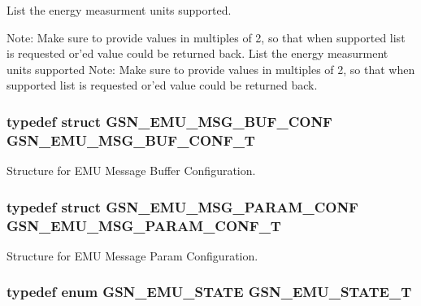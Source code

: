 List the energy measurment units supported. 

Note: Make sure to provide values in multiples of 2, so that when supported list is requested or'ed value could be returned back. List the energy measurment units supported Note: Make sure to provide values in multiples of 2, so that when supported list is requested or'ed value could be returned back. \hypertarget{a00663_gacf296ce2d4fd56e05d1ddfc4e41e07ce}{
\subsubsection[{GSN\_\-EMU\_\-MSG\_\-BUF\_\-CONF\_\-T}]{\setlength{\rightskip}{0pt plus 5cm}typedef struct {\bf GSN\_\-EMU\_\-MSG\_\-BUF\_\-CONF} {\bf GSN\_\-EMU\_\-MSG\_\-BUF\_\-CONF\_\-T}}}
\label{a00663_gacf296ce2d4fd56e05d1ddfc4e41e07ce}


Structure for EMU Message Buffer Configuration. 

\hypertarget{a00663_gae3dd9cf1f519ba6879f6f928ac33c1c4}{
\subsubsection[{GSN\_\-EMU\_\-MSG\_\-PARAM\_\-CONF\_\-T}]{\setlength{\rightskip}{0pt plus 5cm}typedef struct {\bf GSN\_\-EMU\_\-MSG\_\-PARAM\_\-CONF} {\bf GSN\_\-EMU\_\-MSG\_\-PARAM\_\-CONF\_\-T}}}
\label{a00663_gae3dd9cf1f519ba6879f6f928ac33c1c4}


Structure for EMU Message Param Configuration. 

\hypertarget{a00663_gab09444b3018b5461230d789c746b56a0}{
\subsubsection[{GSN\_\-EMU\_\-STATE\_\-T}]{\setlength{\rightskip}{0pt plus 5cm}typedef enum {\bf GSN\_\-EMU\_\-STATE} {\bf GSN\_\-EMU\_\-STATE\_\-T}}}
\label{a00663_gab09444b3018b5461230d789c746b56a0}


